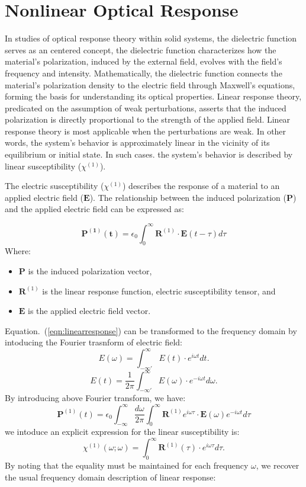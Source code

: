 \section{Nonlinear Optical Response}
In studies of optical response theory within solid systems, the dielectric function serves as an centered concept, the dielectric function characterizes how the material's polarization, induced by the external field, evolves with the field's frequency and intensity. Mathematically, the dielectric function connects the material's polarization density to the electric field through Maxwell's equations, forming the basis for understanding its optical properties. Linear response theory, predicated on the assumption of weak perturbations, asserts that the induced polarization is directly proportional to the strength of the applied field.
Linear response theory is most applicable when the perturbations are weak. In other words, the system's behavior is approximately linear in the vicinity of its equilibrium or initial state.
In such cases. the system's behavior is described by linear susceptibility ($\chi^{(1)}$).

The electric susceptibility ($\chi^{(1)}$) describes the response of a material to an applied electric field ($\mathbf{E}$). The relationship between the induced polarization ($\mathbf{P}$) and the applied electric field can be expressed as:

\begin{equation}
	\mathbf{P^{(1)}(t)} =\epsilon_0 \int_{0}^{\infty}\mathbf R^{(1)} \cdot \mathbf{E}(t-\tau)d\tau
	\label{eqn:linearresponse}
\end{equation}
Where:
\begin{itemize}
	\item $\mathbf{P}$ is the induced polarization vector,
	\item $\mathbf R^{(1)}$ is the linear response function, electric susceptibility tensor, and
	\item $\mathbf{E}$ is the applied electric field vector.

\end{itemize}
Equation.~(\ref{eqn:linearresponse}) can be transformed to the frequency domain by intoducing the
Fourier trasnform of electric field:
\[
	E(\omega) =\int_{-\infty'}^{\infty}E(t) \cdot e^{i\omega t} dt.
\]
\[
	E(t) =\frac{1}{2\pi}\int_{-\infty'}^{\infty}E(\omega) \cdot e^{-i\omega t} d\omega.
\]
By introducing above Fourier transform, we have:
\[
	\mathbf P^{(1)}(t) =\epsilon_0 \int_{-\infty}^{\infty} \frac{d\omega}{2\pi} \int_{0}^{\infty}\mathbf R^{(1)} e^{i\omega \tau} \cdot \mathbf{E}(\omega) e^{-i\omega t} d\tau
\]
we intoduce an explicit expression for the linear susceptibility is:
\[
	\chi^{(1)}(\omega;\omega) =\int_{0}^{\infty}\mathbf R^{(1)}(\tau) \cdot e^{i\omega \tau} d\tau.
\]
By noting that the equality must be maintained for each frequency $\omega$, we recover the usual
frequency domain description of linear response:

